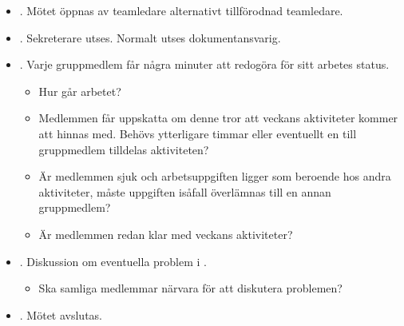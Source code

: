 \vspace{10mm}

\begin{itemize}
\item{. Mötet öppnas av teamledare alternativt tillförodnad teamledare.}
\item{. Sekreterare utses. Normalt utses dokumentansvarig.}
\item{. Varje gruppmedlem får några minuter att redogöra för sitt arbetes status.
  \begin{itemize}
  \item{Hur går arbetet?}
  \item{Medlemmen får uppskatta om denne tror att veckans aktiviteter kommer att hinnas med. Behövs ytterligare timmar eller eventuellt en till gruppmedlem tilldelas aktiviteten?}
  \item{Är medlemmen sjuk och arbetsuppgiften ligger som beroende hos andra aktiviteter, måste uppgiften isåfall överlämnas till en annan gruppmedlem?}
  \item{Är medlemmen redan klar med veckans aktiviteter?}
  \end{itemize}
}

\item{. Diskussion om eventuella problem i .
  \begin{itemize}
  \item{Ska samliga medlemmar närvara för att diskutera problemen?}
  \end{itemize}
}

\item{. Mötet avslutas.}
\end{itemize}

